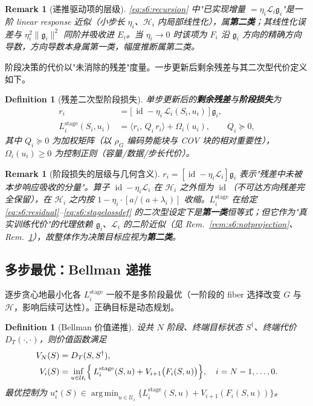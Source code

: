 \documentclass[11pt,a4paper]{article}
\newtheorem{definition}[theorem]{Definition}
\newtheorem{remark}[theorem]{Remark}
\DeclareMathOperator{\id}{id}
\DeclareMathOperator*{\argmin}{arg\,min}
\newcommand{\cH}{\mathcal{H}}   %
\newcommand{\cL}{\mathcal{L}}   %
\newcommand{\cU}{\mathcal{U}}   %
\newcommand{\gres}{\bm{\mathfrak{g}}} %
\begin{document}
\begin{remark}[递推驱动项的层级]\label{rem:s6:tier-recursion}
\eqref{eq:s6:recursion} 中"已实现增量 $=\eta_i\cL_i\gres_i$"是一阶 linear response 近似（小步长 $\eta_i$、$\cH_i$ 内局部线性化），属\textbf{第二类}；其线性化误差与 $\eta_i^2\|\gres_i\|^2$ 同阶并吸收进 $E_i$。当 $\eta_i\to0$ 时该项为 $F_i$ 沿 $\gres_i$ 方向的精确方向导数，方向导数本身属第一类，幅度推断属第二类。
\end{remark}

阶段决策的代价以"未消除的残差"度量。一步更新后剩余残差与其二次型代价定义如下。

\begin{definition}[残差二次型阶段损失]\label{def:s6:stageloss}
单步更新后的\textbf{剩余残差}与\textbf{阶段损失}为
\begin{align}
r_i&=\bigl[\,\id-\eta_i\,\cL_i(S_i,u_i)\,\bigr]\,\gres_i, \label{eq:s6:residual}\\
L_i^{\mathrm{stage}}(S_i,u_i)&=\langle r_i,\,Q_i\,r_i\rangle+\Omega_i(u_i),\qquad Q_i\succeq 0, \label{eq:s6:stagelossdef}
\end{align}
其中 $Q_i\succeq0$ 为加权矩阵（以 $\rho_G$ 编码势能块与 COV 块的相对重要性），$\Omega_i(u_i)\ge0$ 为控制正则（容量/数据/步长代价）。
\end{definition}

\begin{remark}[阶段损失的层级与几何含义]\label{rem:s6:tier-stage}
$r_i=[\id-\eta_i\cL_i]\gres_i$ 表示"残差中未被本步响应吸收的分量"。算子 $\id-\eta_i\cL_i$ 在 $\cH_i$ 之外恒为 $\id$（不可达方向残差完全保留），在 $\cH_i$ 之内按 $1-\eta_i\cdot[a/(a+\lambda_i)]$ 收缩。$L_i^{\mathrm{stage}}$ 在给定 \eqref{eq:s6:residual}--\eqref{eq:s6:stagelossdef} 的二次型设定下是\textbf{第一类}恒等式；但它作为"真实训练代价"的代理依赖 $\gres_i$、$\cL_i$ 的二阶近似（见 Rem.~\ref{rem:s6:notprojection}、Rem.~\ref{rem:s6:tier-recursion}），故整体作为决策目标应视为\textbf{第二类}。
\end{remark}

\subsection{多步最优：Bellman 递推}

逐步贪心地最小化各 $L_i^{\mathrm{stage}}$ 一般不是多阶段最优（一阶段的 fiber 选择改变 $G$ 与 $\cH$，影响后续可达性）。正确目标是动态规划。

\begin{definition}[Bellman 价值递推]\label{def:s6:bellman}
设共 $N$ 阶段、终端目标状态 $S^\dagger$、终端代价 $D_T(\cdot,\cdot)$，则价值函数满足
\begin{align}
V_N(S)&=D_T(S,S^\dagger),\label{eq:s6:terminal}\\
V_i(S)&=\inf_{u\in\cU_i}\Bigl\{\,L_i^{\mathrm{stage}}(S,u)+V_{i+1}\bigl(F_i(S,u)\bigr)\Bigr\},\quad i=N-1,\dots,0.\label{eq:s6:bellman}
\end{align}
最优控制为 $u_i^\star(S)\in\argmin_{u\in\cU_i}\{L_i^{\mathrm{stage}}(S,u)+V_{i+1}(F_i(S,u))\}$。
\end{definition}
\end{document}
